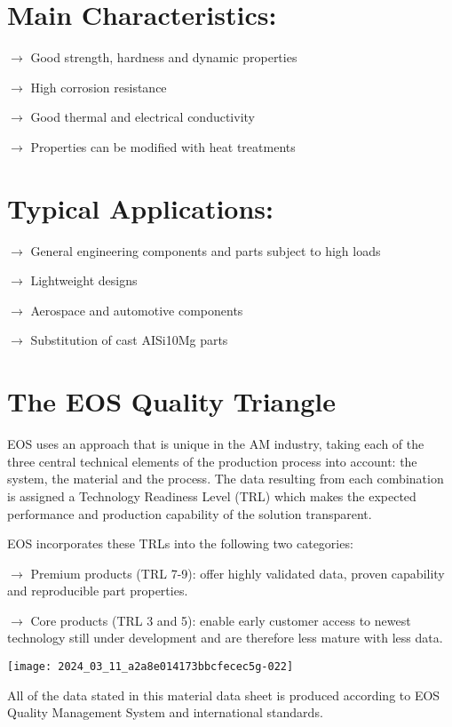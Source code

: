 \documentclass[10pt]{article}
\begin{document}
\section*{Main Characteristics:}
$\longrightarrow$ Good strength, hardness and dynamic properties

$\longrightarrow$ High corrosion resistance

$\longrightarrow$ Good thermal and electrical conductivity

$\longrightarrow$ Properties can be modified with heat treatments

\section*{Typical Applications:}
$\longrightarrow$ General engineering components and parts subject to high loads

$\longrightarrow$ Lightweight designs

$\longrightarrow$ Aerospace and automotive components

$\longrightarrow$ Substitution of cast AISi10Mg parts

\section*{The EOS Quality Triangle}
EOS uses an approach that is unique in the AM industry, taking each of the three central technical elements of the production process into account: the system, the material and the process. The data resulting from each combination is assigned a Technology Readiness Level (TRL) which makes the expected performance and production capability of the solution transparent.

EOS incorporates these TRLs into the following two categories:

$\longrightarrow$ Premium products (TRL 7-9): offer highly validated data, proven capability and reproducible part properties.

$\longrightarrow$ Core products (TRL 3 and 5): enable early customer access to newest technology still under development and are therefore less mature with less data.

\begin{center}
\texttt{[image: 2024\_03\_11\_a2a8e014173bbcfecec5g-022]}
\end{center}

All of the data stated in this material data sheet is produced according to EOS Quality Management System and international standards.
\end{document}
